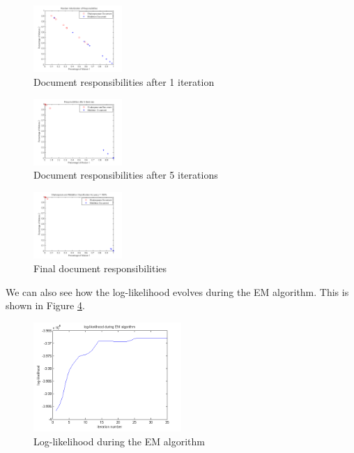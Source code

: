 \documentclass[paper=a4, fontsize=11pt]{scrartcl} %
\begin{document}
\begin{figure}
\centering
\includegraphics[width=0.3\textwidth]{RandInit.png}
\caption{Document responsibilities after 1 iteration}
\label{fig:randinit}
\end{figure}

\begin{figure}
\centering
\includegraphics[width=0.3\textwidth]{5iter.png}
\caption{Document responsibilities after 5 iterations}
\label{fig:iter}
\end{figure}

\begin{figure}[H]
\centering
\includegraphics[width=0.3\textwidth]{classification_acc.png}
\caption{Final document responsibilities}
\label{fig:classificationacc}
\end{figure}

We can also see how the log-likelihood evolves during the EM algorithm.
This is shown in Figure \ref{fig:ll}.

\begin{figure}
\centering
\includegraphics[width=0.5\textwidth]{log-likelihood.png}
\caption{Log-likelihood during the EM algorithm}
\label{fig:ll}
\end{figure}
\end{document}
